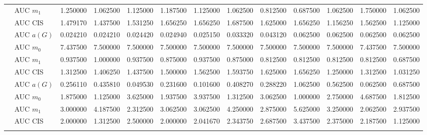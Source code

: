 \begin{table}[htbp]
\begin{tabular}{llrrrrrrrrrrr}
    & AUC $m_1$ & 1.250000 & 1.062500 & 1.125000 & 1.187500 & 1.125000 & 1.062500 & 0.812500 & 0.687500 & 1.062500 & 1.750000 & 1.062500 \\
    & AUC CIS & 1.479170 & 1.437500 & 1.531250 & 1.656250 & 1.656250 & 1.687500 & 1.625000 & 1.656250 & 1.156250 & 1.562500 & 1.125000 \\
    \addlinespace
    \multirow{4}{*}{degree} & AUC $a(G)$ & 0.024210 & 0.024210 & 0.024420 & 0.024940 & 0.025150 & 0.033320 & 0.043120 & 0.062500 & 0.062500 & 0.062500 & 0.062500 \\
    & AUC $m_0$ & 7.437500 & 7.500000 & 7.500000 & 7.500000 & 7.500000 & 7.500000 & 7.500000 & 7.500000 & 7.500000 & 7.437500 & 7.500000 \\
    & AUC $m_1$ & 0.937500 & 1.000000 & 0.937500 & 0.875000 & 0.937500 & 0.875000 & 0.812500 & 0.812500 & 0.812500 & 0.812500 & 0.687500 \\
    & AUC CIS & 1.312500 & 1.406250 & 1.437500 & 1.500000 & 1.562500 & 1.593750 & 1.625000 & 1.656250 & 1.250000 & 1.312500 & 1.031250 \\
    \addlinespace
    \multirow{4}{*}{random} & AUC $a(G)$ & 0.256110 & 0.435810 & 0.049530 & 0.231600 & 0.101600 & 0.408270 & 0.288220 & 1.062500 & 0.562500 & 0.062500 & 0.687500 \\
    & AUC $m_0$ & 1.875000 & 1.125000 & 3.625000 & 1.937500 & 3.937500 & 1.312500 & 3.062500 & 1.000000 & 2.750000 & 4.687500 & 1.812500 \\
    & AUC $m_1$ & 3.000000 & 4.187500 & 2.312500 & 3.062500 & 3.062500 & 4.250000 & 2.875000 & 5.625000 & 3.250000 & 2.062500 & 2.937500 \\
    & AUC CIS & 2.000000 & 1.312500 & 2.500000 & 2.000000 & 2.041670 & 2.343750 & 2.687500 & 3.437500 & 2.375000 & 2.187500 & 1.125000 \\
    \addlinespace
    \bottomrule
  \end{tabular}
\end{table}


